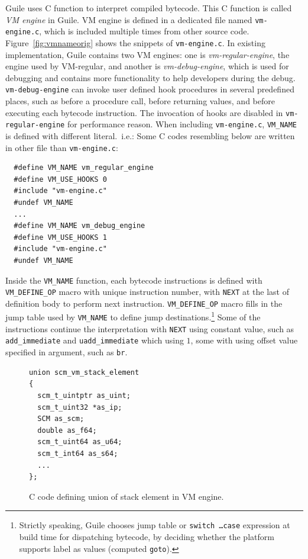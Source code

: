 \documentclass[preprint, 10pt]{sigplanconf}
\begin{document}
Guile uses C function to interpret compiled bytecode. This C function is called
\textit{VM engine} in Guile. VM engine is defined in a dedicated file named
\texttt{vm-engine.c}, which is included multiple times from other source
code. Figure~\hyperref[fig:vmnameorig]{\ref{fig:vmnameorig}} shows the snippets
of \texttt{vm-engine.c}. In existing implementation, Guile contains two VM
engines: one is \textit{vm-regular-engine}, the engine used by VM-regular, and
another is \textit{vm-debug-engine}, which is used for debugging and contains
more functionality to help developers during the debug. \texttt{vm-debug-engine}
can invoke user defined hook procedures in several predefined places, such as
before a procedure call, before returning values, and before executing each
bytecode instruction. The invocation of hooks are disabled in
\texttt{vm-regular-engine} for performance reason. When including
\texttt{vm-engine.c}, \texttt{VM\_NAME} is defined with different
literal.\ i.e.: Some C codes resembling below are written in other file than
\texttt{vm-engine.c}:

\begin{verbatim}
  #define VM_NAME vm_regular_engine
  #define VM_USE_HOOKS 0
  #include "vm-engine.c"
  #undef VM_NAME
  ...
  #define VM_NAME vm_debug_engine
  #define VM_USE_HOOKS 1
  #include "vm-engine.c"
  #undef VM_NAME
\end{verbatim}

Inside the \texttt{VM\_NAME} function, each bytecode instructions is defined
with \texttt{VM\_DEFINE\_OP} macro with unique instruction number, with
\texttt{NEXT} at the last of definition body to perform next
instruction. \texttt{VM\_DEFINE\_OP} macro fills in the jump table used by
\texttt{VM\_NAME} to define jump destinations.\footnote{Strictly speaking, Guile
  chooses jump table or \texttt{switch \ldots\@ case} expression at build time for
  dispatching bytecode, by deciding whether the platform supports label as
  values (computed \texttt{goto}).}  Some of the instructions continue the
interpretation with \texttt{NEXT} using constant value, such as
\texttt{add\_immediate} and \texttt{uadd\_immediate} which using $1$, some with
using offset value specified in argument, such as \texttt{br}.

\begin{figure}
  \centering
  \small
\begin{verbatim}
union scm_vm_stack_element
{
  scm_t_uintptr as_uint;
  scm_t_uint32 *as_ip;
  SCM as_scm;
  double as_f64;
  scm_t_uint64 as_u64;
  scm_t_int64 as_s64;
  ...
};
\end{verbatim}
\caption{C code defining union of stack element in VM engine.}
\label{fig:stackelem}
\end{figure}
\end{document}
